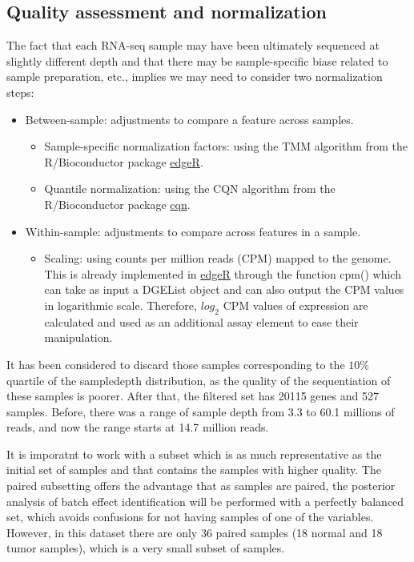 \documentclass[9pt,twocolumn,twoside]{gsajnl}
\begin{document}
\subsection*{Quality assessment and normalization}
The fact that each RNA-seq sample may have been ultimately sequenced at slightly different depth and that there may be sample-specific biase related to sample preparation, etc., implies we may need to consider two normalization steps:
\begin{itemize}
\item Between-sample: adjustments to compare a feature across samples.
\begin{itemize}
\item Sample-specific normalization factors: using the TMM algorithm from the R/Bioconductor package \href{http://bioconductor.org/packages/release/bioc/html/edgeR.html}{edgeR}.
\item Quantile normalization: using the CQN algorithm from the R/Bioconductor package \href{http://bioconductor.org/packages/release/bioc/html/cqn.html}{cqn}.
\end{itemize}
\item Within-sample: adjustments to compare across features in a sample.
\begin{itemize}
\item Scaling: using counts per million reads (CPM) mapped to the genome. This is already implemented in \href{http://bioconductor.org/packages/release/bioc/html/edgeR.html}{edgeR} through the function cpm() which can take as input a DGEList object and can also output the CPM values in logarithmic scale. Therefore, $log_{2}$ CPM values of expression are calculated and used as an additional assay element to ease their manipulation.
\end{itemize}
\end{itemize}

It has been considered to discard those samples corresponding to the $ 10\% $ quartile of the sampledepth distribution, as the quality of the sequentiation of these samples is poorer. After that, the filtered set has 20115 genes and 527 samples. Before, there was a range of sample depth from 3.3 to 60.1 millions of reads, and now the range starts at 14.7 million reads.

It is imporatnt to work with a subset which is as much representative as the initial set of samples and that contains the samples with higher quality. The paired subsetting offers the advantage that as samples are paired, the posterior analysis of batch effect identification will be performed with a perfectly balanced set, which avoids confusions for not having samples of one of the variables. However, in this dataset there are only 36 paired samples (18 normal and 18 tumor samples), which is a very small subset of samples.
\end{document}
